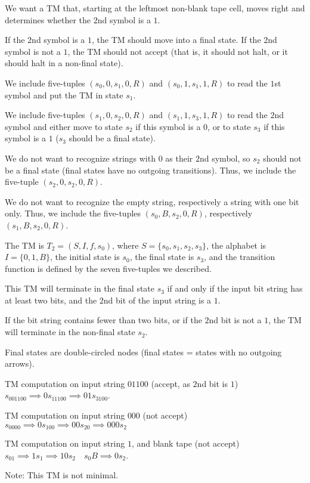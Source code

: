 \documentclass{article}
\begin{document}
We want a TM that, starting at the leftmost non-blank tape cell, moves right and determines whether the $2$nd symbol is a $1$. 

If the $2$nd symbol is a $1$, the TM should move into a final state. If the $2$nd symbol is not a $1$, the TM should not accept (that is, it should not halt, or it should halt in a non-final state).

We include five-tuples $(s_0, 0, s_1, 0, R)$ and $(s_0, 1, s_1, 1, R)$ to read the $1$st symbol and put the TM in state $s_1$. 

We include five-tuples $(s_1, 0, s_2, 0, R)$ and $(s_1, 1, s_3, 1, R)$ to read the $2$nd symbol and either move to state $s_2$ if this symbol is a $0$, or to state $s_3$ if this symbol is a $1$ ($s_3$ should be a final state).

We do not want to recognize strings with $0$ as their $2$nd symbol, so $s_2$ should not be a final state (final states have no outgoing transitions). Thus, we include the five-tuple $(s_2, 0, s_2, 0, R)$.

We do not want to recognize the empty string, respectively a string with one bit only. Thus, we include the five-tuples $(s_0, B, s_2, 0, R)$, respectively $(s_1, B, s_2, 0, R)$.

The TM is $T_2 = (S, I, f, s_0)$, where $S = \{s_0, s_1, s_2, s_3\}$, the alphabet is $I = \{0,1, B\}$, the initial state is $s_0$, the final state is $s_3$, and the transition function is defined by the seven five-tuples we described.

This TM will terminate in the final state $s_3$ if and only if the input bit string has at least two bits, and the $2$nd bit of the input string is a $1$. 

If the bit string contains fewer than two bits, or if the $2$nd bit is not a $1$, the TM will terminate in the non-final state $s_2$. 

Final states are double-circled nodes (final states = states with no outgoing arrows).

TM computation on input string $01100$ (accept, as $2$nd bit is $1$) $s_001100 \implies 0s_11100 \implies 01s_3100$.

TM computation on input string $000$ (not accept) $s_0000 \implies 0s_100 \implies 00s_20 \implies 000s_2$

TM computation on input string $1$, and blank tape (not accept) $s_01 \implies 1s_1 \implies 10s_2 \quad s_0B \implies 0s_2$.

Note: This TM is not minimal.
\end{document}
